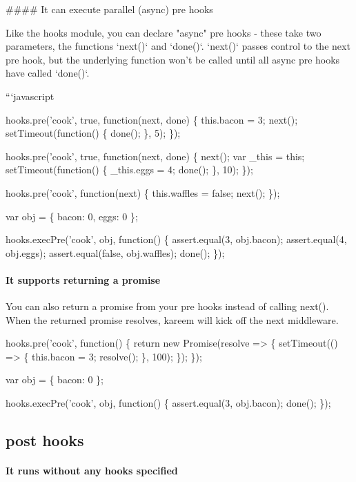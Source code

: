 \begin{DoxyCode}
#### It can execute parallel (async) pre hooks

Like the hooks module, you can declare "async" pre hooks - these take two
parameters, the functions `next()` and `done()`. `next()` passes control to
the next pre hook, but the underlying function won't be called until all
async pre hooks have called `done()`.


```javascript

    hooks.pre('cook', true, function(next, done) \{
      this.bacon = 3;
      next();
      setTimeout(function() \{
        done();
      \}, 5);
    \});

    hooks.pre('cook', true, function(next, done) \{
      next();
      var \_this = this;
      setTimeout(function() \{
        \_this.eggs = 4;
        done();
      \}, 10);
    \});

    hooks.pre('cook', function(next) \{
      this.waffles = false;
      next();
    \});

    var obj = \{ bacon: 0, eggs: 0 \};

    hooks.execPre('cook', obj, function() \{
      assert.equal(3, obj.bacon);
      assert.equal(4, obj.eggs);
      assert.equal(false, obj.waffles);
      done();
    \});
\end{DoxyCode}


\paragraph*{It supports returning a promise}

You can also return a promise from your pre hooks instead of calling {\ttfamily next()}. When the returned promise resolves, kareem will kick off the next middleware.


\begin{DoxyCode}
hooks.pre('cook', function() \{
  return new Promise(resolve => \{
    setTimeout(() => \{
      this.bacon = 3;
      resolve();
    \}, 100);
  \});
\});

var obj = \{ bacon: 0 \};

hooks.execPre('cook', obj, function() \{
  assert.equal(3, obj.bacon);
  done();
\});
\end{DoxyCode}


\subsection*{post hooks}

\paragraph*{It runs without any hooks specified}


